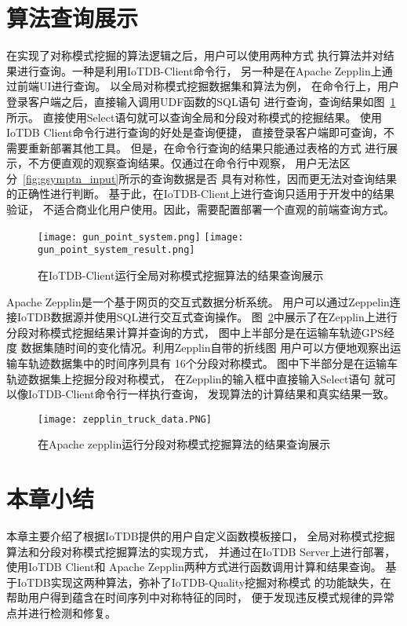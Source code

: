 \section{算法查询展示}

在实现了对称模式挖掘的算法逻辑之后，用户可以使用两种方式
执行算法并对结果进行查询。一种是利用IoTDB-Client命令行，
另一种是在Apache Zepplin上通过前端UI进行查询。
以全局对称模式挖掘数据集和算法为例，
在命令行上，用户登录客户端之后，直接输入调用UDF函数的SQL语句
进行查询，查询结果如图~\ref{fig:iotdb_client_symptn}所示。
直接使用Select语句就可以查询全局和分段对称模式的挖掘结果。
使用IoTDB Client命令行进行查询的好处是查询便捷，
直接登录客户端即可查询，不需要重新部署其他工具。
但是，在命令行查询的结果只能通过表格的方式
进行展示，不方便直观的观察查询结果。仅通过在命令行中观察，
用户无法区分~\ref{fig:gsymptn_input}所示的查询数据是否
具有对称性，因而更无法对查询结果的正确性进行判断。
基于此，在IoTDB-Client上进行查询只适用于开发中的结果验证，
不适合商业化用户使用。因此，需要配置部署一个直观的前端查询方式。
\begin{figure}
    \centering
    {\texttt{[image: gun\_point\_system.png]}}
    {\texttt{[image: gun\_point\_system\_result.png]}}
    \caption{在IoTDB-Client运行全局对称模式挖掘算法的结果查询展示}
    \label{fig:iotdb_client_symptn}
\end{figure}

Apache Zepplin是一个基于网页的交互式数据分析系统。
用户可以通过Zeppelin连接IoTDB数据源并使用SQL进行交互式查询操作。
图~\ref{fig:iotdb_zepplin_symptn}中展示了在Zepplin上进行
分段对称模式挖掘结果计算并查询的方式，
图中上半部分是在运输车轨迹GPS经度
数据集随时间的变化情况。利用Zepplin自带的折线图
用户可以方便地观察出运输车轨迹数据集中的时间序列具有
16个分段对称模式。
图中下半部分是在运输车轨迹数据集上挖掘分段对称模式，
在Zepplin的输入框中直接输入Select语句
就可以像IoTDB-Client命令行一样执行查询，
发现算法的计算结果和真实结果一致。
\begin{figure}
    \centering
    \texttt{[image: zepplin\_truck\_data.PNG]}
    \caption{在Apache zepplin运行分段对称模式挖掘算法的结果查询展示}
    \label{fig:iotdb_zepplin_symptn}
\end{figure}


\section{本章小结}
本章主要介绍了根据IoTDB提供的用户自定义函数模板接口，
全局对称模式挖掘算法和分段对称模式挖掘算法的实现方式，
并通过在IoTDB Server上进行部署，使用IoTDB Client和
Apache Zepplin两种方式进行函数调用计算和结果查询。
基于IoTDB实现这两种算法，弥补了IoTDB-Quality挖掘对称模式
的功能缺失，在帮助用户得到蕴含在时间序列中对称特征的同时，
便于发现违反模式规律的异常点并进行检测和修复。
